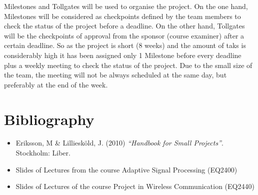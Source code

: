 \documentclass[11pt]{article}
\begin{document}
Milestones and Tollgates will be used to organise the project. On the one hand, Milestones will be considered as checkpoints defined by the team members to check the status of the project before a deadline. On the other hand, Tollgates will be the checkpoints of approval from the sponsor (course examiner) after a certain deadline. So as the project is short (8 weeks) and the amount of taks is considerably high it has been assigned only 1 Milestone before every deadline plus a weekly meeting to check the status of the project. Due to the small size of the team, the meeting will not be always scheduled at the same day, but preferably at the end of the week.

\section{Bibliography}


\begin{itemize}
\item Eriksson, M \& Lilliesköld, J. (2010) \textit{``Handbook for Small Projects''}. Stockholm: Liber.
\item Slides of Lectures from the course Adaptive Signal Processing (EQ2400)
\item Slides of Lectures of the course Project in Wireless Communication (EQ2440)
\end{itemize}






\end{document}
